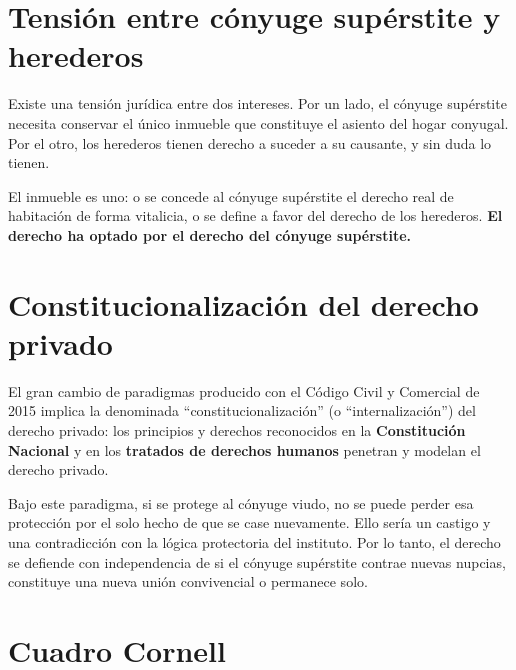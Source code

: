 \documentclass[12pt,oneside]{book}
\begin{document}
\section{Tensión entre cónyuge supérstite y herederos}

Existe una tensión jurídica entre dos intereses. Por un lado, el cónyuge supérstite necesita conservar el único inmueble que constituye el asiento del hogar conyugal. Por el otro, los herederos tienen derecho a suceder a su causante, y sin duda lo tienen.

\begin{important}
El inmueble es uno: o se concede al cónyuge supérstite el derecho real de habitación de forma vitalicia, o se define a favor del derecho de los herederos. \textbf{El derecho ha optado por el derecho del cónyuge supérstite.}
\end{important}

\section{Constitucionalización del derecho privado}

El gran cambio de paradigmas producido con el Código Civil y Comercial de 2015 implica la denominada ``constitucionalización'' (o ``internalización'') del derecho privado: los principios y derechos reconocidos en la \textbf{Constitución Nacional} y en los \textbf{tratados de derechos humanos} penetran y modelan el derecho privado.

Bajo este paradigma, si se protege al cónyuge viudo, no se puede perder esa protección por el solo hecho de que se case nuevamente. Ello sería un castigo y una contradicción con la lógica protectoria del instituto. Por lo tanto, el derecho se defiende con independencia de si el cónyuge supérstite contrae nuevas nupcias, constituye una nueva unión convivencial o permanece solo.

\section{Cuadro Cornell}
\end{document}
